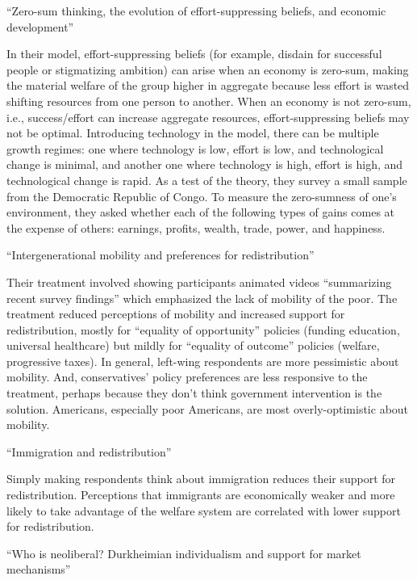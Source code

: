 \documentclass{article}
\begin{document}
\medskip \noindent \textbf{\cite{carvalho2023zero}} ``Zero-sum thinking, the evolution of effort-suppressing beliefs, and economic development''

In their model, effort-suppressing beliefs (for example, disdain for successful people or stigmatizing ambition) can arise when an economy is zero-sum, making the material welfare of the group higher in aggregate because less effort is wasted shifting resources from one person to another. When an economy is not zero-sum, i.e., success/effort can increase aggregate resources, effort-suppressing beliefs may not be optimal. Introducing technology in the model, there can be multiple growth regimes: one where technology is low, effort is low, and technological change is minimal, and another one where technology is high, effort is high, and technological change is rapid.
As a test of the theory, they survey a small sample from the Democratic Republic of Congo. To measure the zero-sumness of one’s environment, they asked whether each of the following types of gains comes at the expense of others: earnings, profits, wealth, trade, power, and happiness.

\medskip \noindent \textbf{\cite{alesina2018intergenerational}} ``Intergenerational mobility and preferences for redistribution''

Their treatment involved showing participants animated videos ``summarizing recent survey findings'' which emphasized the lack of mobility of the poor. The treatment reduced perceptions of mobility and increased support for redistribution, mostly for “equality of opportunity” policies (funding education, universal healthcare) but mildly for ``equality of outcome'' policies (welfare, progressive taxes). In general, left-wing respondents are more pessimistic about mobility. And, conservatives' policy preferences are less responsive to the treatment, perhaps because they don't think government intervention is the solution.
Americans, especially poor Americans, are most overly-optimistic about mobility.

\medskip \noindent \textbf{\cite{alesina2023immigration}} ``Immigration and redistribution''

Simply making respondents think about immigration reduces their support for redistribution. Perceptions that immigrants are economically weaker and more likely to take advantage of the welfare system are correlated with lower support for redistribution.

\medskip \noindent \textbf{\cite{landier2022neoliberal}} ``Who is neoliberal? Durkheimian individualism and support for market mechanisms''
\end{document}
